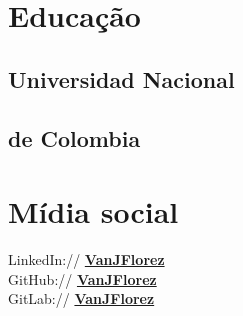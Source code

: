 \documentclass[]{CV-JuanCamiloFlorez}
\begin{document}
%
%
\lastupdated

%
%

%
%
\begin{minipage}[t]{0.33\textwidth} 

\section{Educação} 
\subsection{Universidad Nacional}
\subsection{de Colombia}
\sectionsep

\section{Mídia social}
    LinkedIn:// \href{https://www.linkedin.com/in/vanjflores/}{\bf VanJFlorez} \\
    GitHub:// \href{https://github.com/jcammmmm}{\bf VanJFlorez} \\
    GitLab:// \href{https://gitlab.com/VanJFlorez}{\bf VanJFlorez} \\
\sectionsep


\end{minipage}
\end{document}
